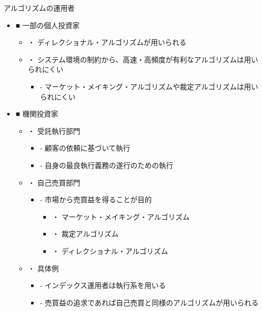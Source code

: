 \documentclass[dvipdfmx, autodetect-engine, aspectratio=169, 10.5pt]{beamer}
\begin{document}
\begin{frame}{アルゴリズムの運用者}
	\scriptsize
	\begin{itemize}
		\item ■ 一部の個人投資家
		      \begin{itemize}
			      \item ・ ディレクショナル・アルゴリズムが用いられる
			      \item ・ システム環境の制約から、高速・高頻度が有利なアルゴリズムは用いられにくい
			            \begin{itemize}
				            \item - マーケット・メイキング・アルゴリズムや裁定アルゴリズムは用いられにくい
			            \end{itemize}
		      \end{itemize}
		\item ■ 機関投資家
		      \begin{itemize}
			      \item ・ 受託執行部門
			            \begin{itemize}
				            \item - 顧客の依頼に基づいて執行
				            \item - 自身の最良執行義務の遂行のための執行
			            \end{itemize}
			      \item ・ 自己売買部門
			            \begin{itemize}
				            \item - 市場から売買益を得ることが目的
				                  \begin{itemize}
					                  \item ・ マーケット・メイキング・アルゴリズム
					                  \item ・ 裁定アルゴリズム
					                  \item ・ ディレクショナル・アルゴリズム
				                  \end{itemize}
			            \end{itemize}
			      \item ・ 具体例
			            \begin{itemize}
				            \item - インデックス運用者は執行系を用いる
				            \item - 売買益の追求であれば自己売買と同様のアルゴリズムが用いられる
			            \end{itemize}
		      \end{itemize}
	\end{itemize}
\end{frame}
\end{document}
